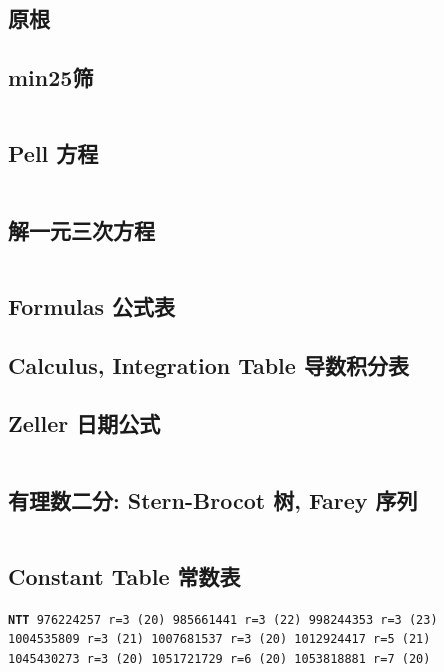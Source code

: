 				\subsection{原根}
					
				\subsection{min25筛}
					\inputminted{cpp}{src/Math/min25筛.cpp}
				\subsection{Pell 方程}
					\inputminted{cpp}{src/Math/Pell方程.cpp}
				\subsection{解一元三次方程}
					\inputminted{cpp}{src/Math/解一元三次方程.cpp}
\begin{spacing}{0.4}
				\subsection{Formulas 公式表}
					
				\subsection{Calculus, Integration Table 导数积分表}
					
					
\end{spacing}
				\subsection{Zeller 日期公式}
					\inputminted{cpp}{src/Miscellany/日期公式.cpp}
				\subsection{有理数二分: Stern-Brocot 树, Farey 序列}
					\inputminted{python}{src/yzh/farey.py}
				\subsection{Constant Table 常数表}
				\label{randomprimes}
				\begin{small}
					\setlength{\parindent}{0em}\setlength{\parskip}{0em}\renewcommand{\baselinestretch}{.8}
					\texttt{}
					\texttt{\textbf{NTT} 976224257 r=3 (20)
					985661441 r=3 (22)
					998244353 r=3 (23)\\
					1004535809 r=3 (21)
					1007681537 r=3 (20)
					1012924417 r=5 (21)\\
					1045430273 r=3 (20)
					1051721729 r=6 (20)
					1053818881 r=7 (20)
					}
				\end{small}
